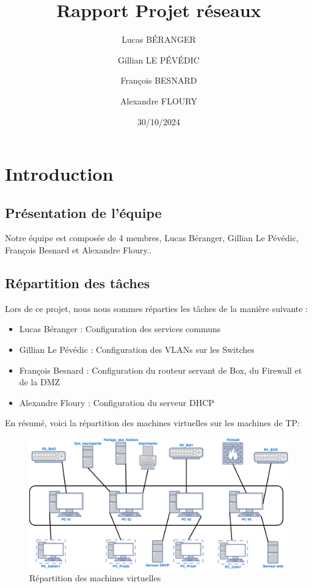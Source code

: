 \documentclass[a4paper,12pt,openany]{report}
\title{Rapport Projet réseaux}
\author{
    Lucas BÉRANGER \and
    Gillian LE PÉVÉDIC \and
    François BESNARD \and
    Alexandre FLOURY \and
}
\date{30/10/2024}
\begin{document}
    \maketitle  
    \newpage

    \tableofcontents
    \newpage
    \listoffigures

    \chapter{Introduction}
        \section{Présentation de l'équipe}  
            Notre équipe est composée de 4 membres, Lucas Béranger, Gillian Le Pévédic, François Besnard et Alexandre Floury..

        \section{Répartition des tâches}
            Lors de ce projet, nous nous sommes réparties les tâches de la manière suivante :
            \begin{itemize}
                \item Lucas Béranger : Configuration des services communs
                \item Gillian Le Pévédic : Configuration des VLANs sur les Switches
                \item François Besnard :  Configuration du routeur servant de Box, du Firewall et de la DMZ
                \item Alexandre Floury : Configuration du serveur DHCP
            \end{itemize}

            En résumé, voici la répartition des machines virtuelles sur les machines de TP:
            \begin{figure}
                \centering
                \includegraphics[width=1.2
                \textwidth]{Images/repartitions_machines.jpg}
                \caption{Répartition des machines virtuelles}
            \end{figure}
\end{document}
